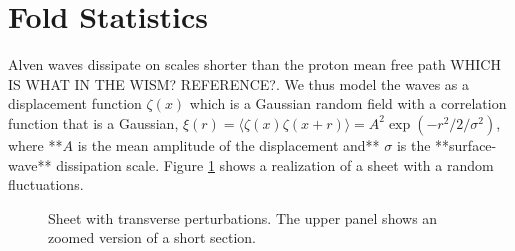 \documentclass[useAMS,usenatbib]{mn2e}
\begin{document}
\section{Fold Statistics}

Alven waves dissipate on scales shorter than the proton mean free
path WHICH IS WHAT IN THE WISM? REFERENCE?.  We thus model the waves as a displacement function $\zeta(x)$
which is a Gaussian random field with a correlation function that is a
Gaussian, $\xi(r)=\langle \zeta(x)
\zeta(x+r)\rangle=A^2\exp(-r^2/2/\sigma^2)$, where **$A$ is the mean amplitude
of the displacement and** $\sigma$ is the **surface-wave**
dissipation scale.  Figure \ref{fig:sheet} shows a realization of a
sheet with a random fluctuations.

\begin{figure}
\centerline{}
\caption{Sheet with transverse perturbations.  The upper panel shows
  an zoomed version of a short section.}
\label{fig:sheet}
\end{figure}
\end{document}
